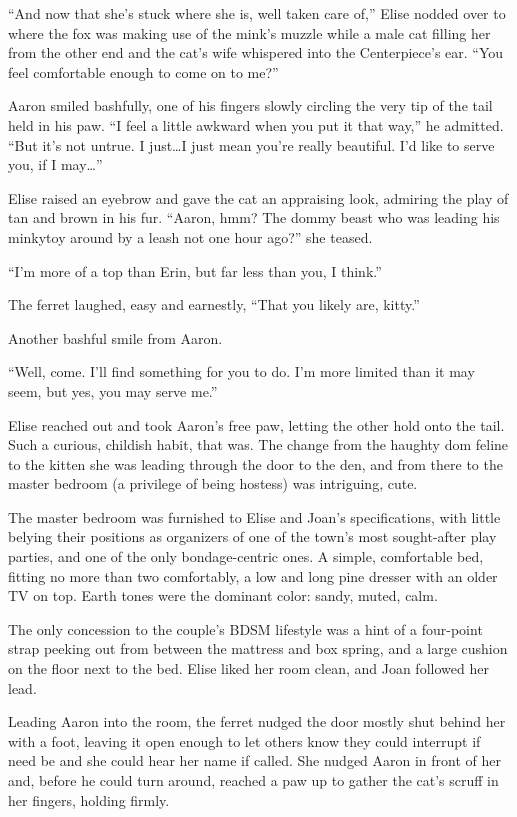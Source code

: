 ``And now that she's stuck where she is, well taken care of,'' Elise nodded over to where the fox was making use of the mink's muzzle while a male cat filling her from the other end and the cat's wife whispered into the Centerpiece's ear. ``You feel comfortable enough to come on to me?''

Aaron smiled bashfully, one of his fingers slowly circling the very tip of the tail held in his paw. ``I feel a little awkward when you put it that way,'' he admitted. ``But it's not untrue. I just\ldots{}I just mean you're really beautiful. I'd like to serve you, if I may\ldots{}''

Elise raised an eyebrow and gave the cat an appraising look, admiring the play of tan and brown in his fur. ``Aaron, hmm? The dommy beast who was leading his minkytoy around by a leash not one hour ago?'' she teased.

``I'm more of a top than Erin, but far less than you, I think.''

The ferret laughed, easy and earnestly, ``That you likely are, kitty.''

Another bashful smile from Aaron.

``Well, come. I'll find something for you to do. I'm more limited than it may seem, but yes, you may serve me.''

Elise reached out and took Aaron's free paw, letting the other hold onto the tail. Such a curious, childish habit, that was. The change from the haughty dom feline to the kitten she was leading through the door to the den, and from there to the master bedroom (a privilege of being hostess) was intriguing, cute.

The master bedroom was furnished to Elise and Joan's specifications, with little belying their positions as organizers of one of the town's most sought-after play parties, and one of the only bondage-centric ones. A simple, comfortable bed, fitting no more than two comfortably, a low and long pine dresser with an older TV on top. Earth tones were the dominant color: sandy, muted, calm.

The only concession to the couple's BDSM lifestyle was a hint of a four-point strap peeking out from between the mattress and box spring, and a large cushion on the floor next to the bed. Elise liked her room clean, and Joan followed her lead.

Leading Aaron into the room, the ferret nudged the door mostly shut behind her with a foot, leaving it open enough to let others know they could interrupt if need be and she could hear her name if called. She nudged Aaron in front of her and, before he could turn around, reached a paw up to gather the cat's scruff in her fingers, holding firmly.

